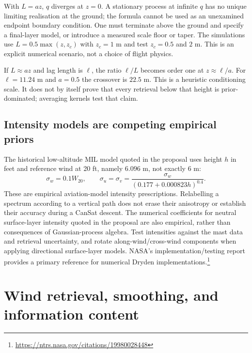 \documentclass[11pt,a4paper]{article}
\numberwithin{equation}{section}
\begin{document}
With $L=az$, $q$ diverges at $z=0$. A stationary process at infinite $q$ has no unique limiting realisation at the ground; the formula cannot be used as an unexamined endpoint boundary condition. One must terminate above the ground and specify a final-layer model, or introduce a measured scale floor or taper. The simulations use $L=0.5\max(z,z_c)$ with $z_c=1$ m and test $z_c=0.5$ and $2$ m. This is an explicit numerical scenario, not a choice of flight physics.

If $L\approx az$ and lag length is $\ell$, the ratio $\ell/L$ becomes order one at $z\approx\ell/a$. For $\ell=11.24$ m and $a=0.5$ the crossover is $22.5$ m. This is a heuristic conditioning scale. It does not by itself prove that every retrieval below that height is prior-dominated; averaging kernels test that claim.

\subsection{Intensity models are competing empirical priors}
The historical low-altitude MIL model quoted in the proposal uses height $h$ in feet and reference wind at 20 ft, namely $6.096$ m, not exactly $6$ m:
\begin{equation}
 \sigma_w=0.1W_{20},\qquad
 \sigma_u=\sigma_v=\frac{\sigma_w}{(0.177+0.000823h)^{0.4}}.
\end{equation}
These are empirical aviation-model intensity prescriptions. Relabelling a spectrum according to a vertical path does not erase their anisotropy or establish their accuracy during a CanSat descent. The numerical coefficients for neutral surface-layer intensity quoted in the proposal are also empirical, rather than consequences of Gaussian-process algebra. Test intensities against the mast data and retrieval uncertainty, and rotate along-wind/cross-wind components when applying directional surface-layer models. NASA's implementation/testing report provides a primary reference for numerical Dryden implementations.\footnote{\url{https://ntrs.nasa.gov/citations/19980028448}}

\section{Wind retrieval, smoothing, and information content}
\label{sec:retrieval}
\end{document}
